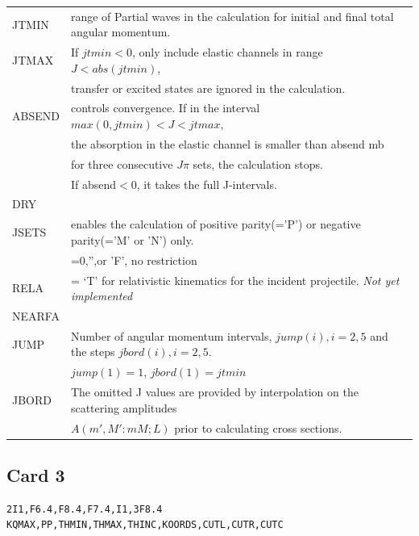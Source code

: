 \documentclass[11pt]{book}
\begin{document}
\begin{table}[h]
\begin{tabular}{|l|l|}
\hline 
JTMIN & range of Partial waves in the calculation for initial and final total angular momentum. \\
JTMAX &  If $jtmin < 0$, only include elastic channels 
        in range $J<abs(jtmin)$, \\
      & transfer or excited states are ignored in the calculation.\\
\hline 
ABSEND & controls convergence. If in the interval $max(0,jtmin)< J < jtmax$, \\
       & the absorption in the elastic channel is smaller than absend mb \\
       & for three consecutive $J\pi$ sets, the calculation stops. \\
       & If absend$<$0, it takes the full J-intervals. \\
\hline        
DRY & \\
JSETS & enables the calculation of positive parity(='P') or negative parity(='M' or 'N') only.\\
    & =0,'',or 'F', no restriction \\
RELA & = `T' for relativistic kinematics for the incident projectile. {\em Not yet implemented}  \\
NEARFA & \\
\hline 
JUMP & Number of angular momentum intervals, $jump(i),i=2,5$ and the steps 
      $jbord(i),i=2,5$. \\
     & $jump(1)=1$, $jbord(1)=jtmin$\\
JBORD & The omitted J values are provided by interpolation on the scattering amplitudes\\
      & $A(m',M':mM;L)$ prior to calculating cross sections. \\      
\hline 
\end{tabular}
\end{table}

\subsection{Card 3}
\begin{verbatim}
2I1,F6.4,F8.4,F7.4,I1,3F8.4  KQMAX,PP,THMIN,THMAX,THINC,KOORDS,CUTL,CUTR,CUTC
\end{verbatim}
\end{document}
